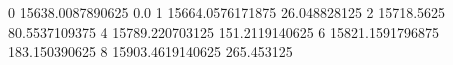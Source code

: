 0 15638.0087890625 0.0
1 15664.0576171875 26.048828125
2 15718.5625 80.5537109375
4 15789.220703125 151.2119140625
6 15821.1591796875 183.150390625
8 15903.4619140625 265.453125
